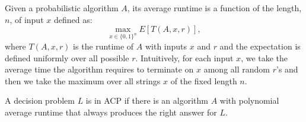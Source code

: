 \begin{definition}
Given a probabilistic algorithm $A$, its average runtime is a function of the length, $n$, of input $x$ defined as:
$$\max_{x \in \{0, 1\}^n} E[T(A, x, r)],$$
where $T(A, x, r)$ is the runtime of $A$ with inputs $x$ and $r$ and the expectation is defined uniformly over all possible $r$. Intuitively, for each input $x$, we take the average time the algorithm requires to terminate on $x$ among all random $r$'s and then we take the maximum over all strings $x$ of the fixed length $n$.  
\end{definition}
\begin{definition}\label{acpdef}
A decision problem $L$ is in ACP if there is an algorithm $A$ with polynomial average runtime that always produces the right answer for $L$.
\end{definition}

